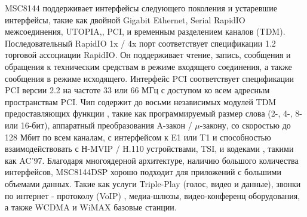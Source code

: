 MSC8144 поддерживает интерфейсы следующего поколения и устаревшие интерфейсы, такие как двойной Gigabit Ethernet, Serial RapidIO межсоединения, UTOPIA,, PCI, и временным разделением каналов (TDM).
Последовательный RapidIO 1x / 4x порт соответствует спецификации 1.2 торговой ассоциации RapidIO. Он поддерживает чтение, запись, сообщения и обращения к техническим средствам в режиме входящего соединения, а также сообщения в режиме исходящего. Интерфейс PCI соответствует спецификации PCI версии 2.2 на частоте 33 или 66 МГц с доступом ко всем адресным пространствам PCI.
Чип содержит до восьми независимых модулей TDM предоставляющих функции , такие как программируемый размер слова (2-, 4-, 8- или 16-бит), аппаратный преобразования A-закон / $\mu$-закону, со скоростью до 128 Мбит по всем каналам, с интерфейсом к E1 или T1 и способностью взаимодействовать с Н-MVIP / H.110 устройствами, TSI, и кодеками , такими как AC'97. 
Благодаря многоядерной архитектуре, наличию большого количества интерфейсов, MSC8144DSP хорошо подходит для приложений с большими объемами данных. Такие как услуги Triple-Play (голос, видео и данные), звонки по интернет - протоколу (VoIP) , медиа-шлюзы, видео-конференц оборудования, а также WCDMA и WiMAX базовые станции.